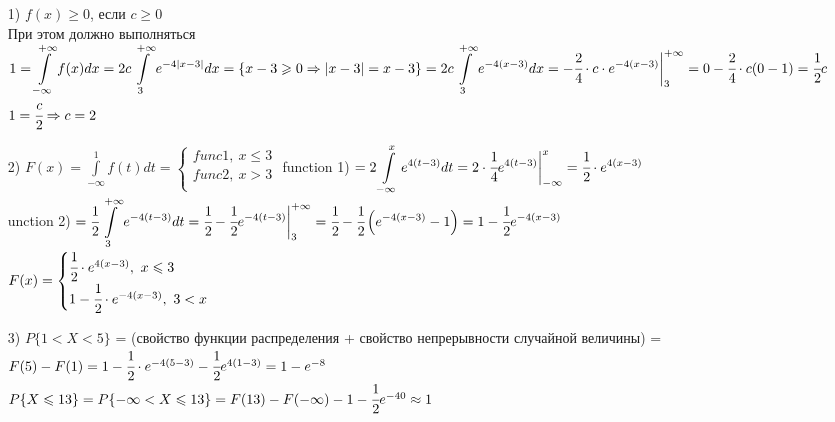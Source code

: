 \begin{enumerate}
	\item[1)] $f(x) \geqslant 0$, если $c \geqslant 0$ \\
	При этом должно выполняться $\displaystyle  1 = \int\limits_{-\infty}^{+\infty} f(x) dx = 2c \int\limits_{3}^{+\infty} e^{-4|x-3|} 		dx = \left\{x - 3 \geqslant 0 \Rightarrow |x-3| = x - 3\right\} = 2c \int\limits_{3}^{+\infty} e^{-4(x-3)} dx = - \cfrac{2}{4} \cdot c 			\cdot e^{-4(x-3)} \bigg|_{3}^{+\infty} = 0 - \cfrac{2}{4} \cdot c (0 - 1) = \cfrac{1}{2} c$ \\
	$1 = \cfrac{c}{2} \Rightarrow c = 2$ \\

	\item[2)]  %
	$\displaystyle  F(x) = \int\limits_{-\infty}^{1} f(t) dt = 
	\begin{cases}
		func 1, \ x \leqslant 3 \\
		func 2, \ x > 3 \\
	\end{cases}$
	function 1) $\displaystyle  = 2 \int\limits_{-\infty}^{x} e^{4(t-3)} dt = 2 \cdot \cfrac{1}{4} e^{4(t-3)} \bigg|_{-\infty}^{x} = \cfrac{1}		{2} \cdot e^{4(x-3)}$ \\
	unction 2) $\displaystyle  = \cfrac{1}{2} \int\limits_{3}^{+\infty} e^{-4(t-3)} dt = \cfrac{1}{2} - \cfrac{1}{2} e^{-4(t-3)} \bigg|_{3}^{+		\infty} = \cfrac{1}{2} - \cfrac{1}{2} \left(e^{-4(x-3)} - 1 \right) = 1 - \cfrac{1}{2} e^{-4(x-3)}$ \\

	$F(x) = 
	\begin{cases}
		\cfrac12 \cdot e^{4(x-3)}, \ x \leqslant 3 \\
		1 - \cfrac12 \cdot e^{-4(x-3)}, \ 3 < x \\
	\end{cases}$

	\item[3)] $P\{1 < X < 5\}$ = (свойство функции распределения + свойство непрерывности случайной величины) = $F(5) - F(1) = 1 - \cfrac12 \cdot e^{-4(5 - 3)} - \cfrac12 e^{4(1 - 3)} = 1 - e^{-8}$ \\
	$P\{X \leqslant 13 \} = P\{ - \infty < X \leqslant 13 \} = F(13) - F(-\infty) - 1 - \cfrac12 e^{-40} \approx 1$ \\
\end{enumerate}
































